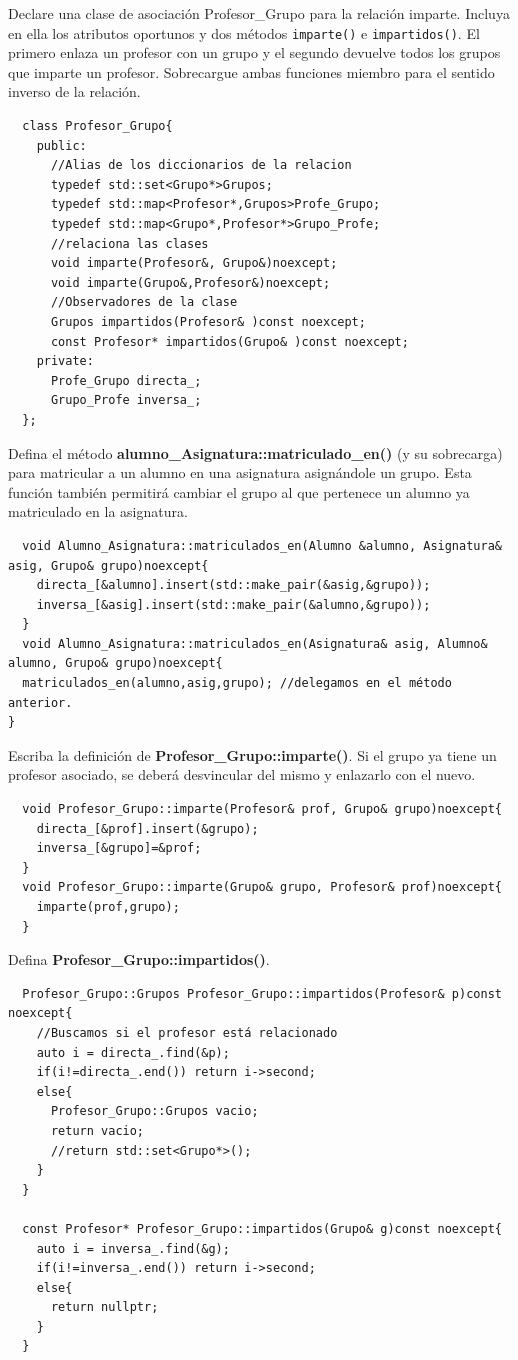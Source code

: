 Declare una clase de asociación Profesor\_Grupo para la relación imparte. Incluya en ella los atributos oportunos y dos métodos \texttt{imparte()} e \texttt{impartidos()}. El primero enlaza un profesor con un grupo y el segundo devuelve todos los grupos que imparte un profesor. Sobrecargue ambas funciones miembro para el sentido inverso de la relación.
\begin{verbatim}
  class Profesor_Grupo{
    public:
      //Alias de los diccionarios de la relacion
      typedef std::set<Grupo*>Grupos;
      typedef std::map<Profesor*,Grupos>Profe_Grupo;
      typedef std::map<Grupo*,Profesor*>Grupo_Profe;
      //relaciona las clases
      void imparte(Profesor&, Grupo&)noexcept;
      void imparte(Grupo&,Profesor&)noexcept;
      //Observadores de la clase
      Grupos impartidos(Profesor& )const noexcept;
      const Profesor* impartidos(Grupo& )const noexcept;
    private:
      Profe_Grupo directa_;
      Grupo_Profe inversa_;
  };
\end{verbatim}
\newpage
{} Defina el método \textbf{alumno\_Asignatura::matriculado\_en()} (y su sobrecarga) para matricular a un alumno en una asignatura asignándole un grupo. Esta función también permitirá cambiar el grupo al que pertenece un alumno ya matriculado en la  asignatura.
\begin{verbatim}
  void Alumno_Asignatura::matriculados_en(Alumno &alumno, Asignatura& asig, Grupo& grupo)noexcept{
    directa_[&alumno].insert(std::make_pair(&asig,&grupo));
    inversa_[&asig].insert(std::make_pair(&alumno,&grupo));
  }
  void Alumno_Asignatura::matriculados_en(Asignatura& asig, Alumno& alumno, Grupo& grupo)noexcept{
  matriculados_en(alumno,asig,grupo); //delegamos en el método anterior.
}
\end{verbatim}
 Escriba la definición de \textbf{Profesor\_Grupo::imparte()}. Si el grupo ya tiene un profesor asociado, se deberá desvincular del mismo y enlazarlo con el nuevo.
\begin{verbatim}
  void Profesor_Grupo::imparte(Profesor& prof, Grupo& grupo)noexcept{
    directa_[&prof].insert(&grupo);
    inversa_[&grupo]=&prof;
  }
  void Profesor_Grupo::imparte(Grupo& grupo, Profesor& prof)noexcept{
    imparte(prof,grupo);
  }
\end{verbatim}
 Defina \textbf{Profesor\_Grupo::impartidos()}.
\begin{verbatim}
  Profesor_Grupo::Grupos Profesor_Grupo::impartidos(Profesor& p)const noexcept{
    //Buscamos si el profesor está relacionado
    auto i = directa_.find(&p);
    if(i!=directa_.end()) return i->second;
    else{
      Profesor_Grupo::Grupos vacio;
      return vacio;
      //return std::set<Grupo*>();
    }
  }

  const Profesor* Profesor_Grupo::impartidos(Grupo& g)const noexcept{
    auto i = inversa_.find(&g);
    if(i!=inversa_.end()) return i->second;
    else{
      return nullptr;
    }
  }
\end{verbatim}
